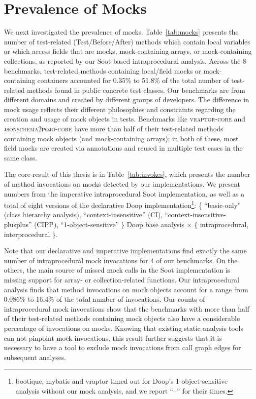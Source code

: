 \section{Prevalence of Mocks}

We next investigated the prevalence of mocks. Table~\ref{tab:mocks} presents the number of test-related (Test/Before/After) methods which contain local variables or which access fields that are mocks, mock-containing arrays, or mock-containing collections, as reported by our Soot-based intraprocedural analysis. Across the 8 benchmarks, test-related methods containing local/field mocks or mock-containing containers accounted for 0.35\% to 51.8\% of the total number of test-related methods found in public concrete test classes. Our benchmarks are from different domains and created by different groups of developers. The difference in mock usage reflects their different philosophies and constraints regarding the creation and usage of mock objects in tests. Benchmarks like \textsc{vraptor-core} and \textsc{jsonschema2pojo-core} have more than half of their test-related methods containing mock objects (and mock-containing arrays); in both of these, most field mocks are created via annotations and reused in multiple test cases in the same class.

The core result of this thesis is in Table~\ref{tab:invokes}, which presents the number of method invocations on mocks detected by our implementations. We present numbers from the imperative intraprocedural Soot implementation, as well as a total of eight versions of the declarative Doop implementation\footnote{bootique, mybatis and vraptor timed out for Doop's 1-object-sensitive analysis without our mock analysis, and we report ``--'' for their times.}: \{ ``basic-only'' (class hierarchy analysis), ``context-insensitive'' (CI), ``context-insensitive-plusplus'' (CIPP), ``1-object-sensitive'' \} Doop base analysis $\times$ \{ intraprocedural, interprocedural \}. 

Note that our declarative and imperative implementations find exactly the same number of intraprocedural mock invocations for 4 of our benchmarks. On the others, the main source of missed mock calls in the Soot implementation is missing support for array- or collection-related functions. Our intraprocedural analysis finds that method invocations on mock objects account for a range from 0.086\% to 16.4\% of the total number of invocations. Our counts of intraprocedural mock invocations show that the benchmarks with more than half of their test-related methods containing mock objects also have a considerable percentage of invocations on mocks. Knowing that existing static analysis tools can not pinpoint mock invocations, this result further suggests that it is necessary to have a tool to exclude mock invocations from call graph edges for subsequent analyses. 

